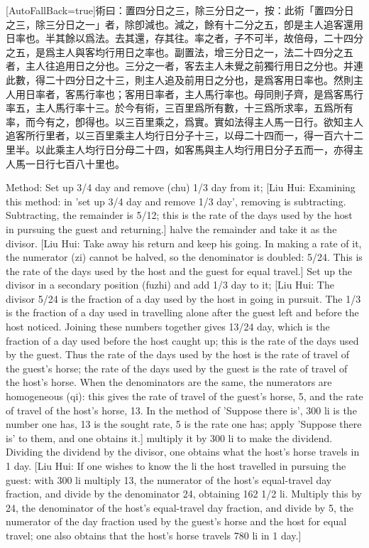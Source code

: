 \documentclass[11pt]{article}
\newcommand{\zhsmall}{\footnotesize\color{black!70}}
\newcommand{\unitlabel}[1]{\marginpar{\raggedleft\tiny\color{gray}#1}}
\newenvironment{unitzh}{\par\CJKfontspec{Noto Serif CJK SC}[AutoFallBack=true]\large\linespread{1.25}\selectfont}{\par}
\newenvironment{uniten}{\par\small\color{black!85}}{\par\medskip}
\begin{document}
\begin{unitzh}\unitlabel{jiuzhang-026.12}術曰：置四分日之三，除三分日之一，{\zhsmall 按：此術「置四分日之三，除三分日之一」者，除卽減也。減之，餘有十二分之五，卽是主人追客還用日率也。}半其餘以爲法。{\zhsmall 去其還，存其往。率之者，子不可半，故倍母，二十四分之五，是爲主人與客均行用日之率也。}副置法，增三分日之一，{\zhsmall 法二十四分之五者，主人往追用日之分也。三分之一者，客去主人未覺之前獨行用日之分也。并連此數，得二十四分日之十三，則主人追及前用日之分也，是爲客用日率也。然則主人用日率者，客馬行率也；客用日率者，主人馬行率也。母同則子齊，是爲客馬行率五，主人馬行率十三。於今有術，三百里爲所有數，十三爲所求率，五爲所有率，而今有之，卽得也。}以三百里乘之，爲實。實如法得主人馬一日行。{\zhsmall 欲知主人追客所行里者，以三百里乘主人均行日分子十三，以母二十四而一，得一百六十二里半。以此乘主人均行日分母二十四，如客馬與主人均行用日分子五而一，亦得主人馬一日行七百八十里也。}\end{unitzh}
\begin{uniten}Method: Set up 3/4 day and remove (chu) 1/3 day from it; [Liu Hui: Examining this method: in 'set up 3/4 day and remove 1/3 day', removing is subtracting. Subtracting, the remainder is 5/12; this is the rate of the days used by the host in pursuing the guest and returning.] halve the remainder and take it as the divisor. [Liu Hui: Take away his return and keep his going. In making a rate of it, the numerator (zi) cannot be halved, so the denominator is doubled: 5/24. This is the rate of the days used by the host and the guest for equal travel.] Set up the divisor in a secondary position (fuzhi) and add 1/3 day to it; [Liu Hui: The divisor 5/24 is the fraction of a day used by the host in going in pursuit. The 1/3 is the fraction of a day used in travelling alone after the guest left and before the host noticed. Joining these numbers together gives 13/24 day, which is the fraction of a day used before the host caught up; this is the rate of the days used by the guest. Thus the rate of the days used by the host is the rate of travel of the guest's horse; the rate of the days used by the guest is the rate of travel of the host's horse. When the denominators are the same, the numerators are homogeneous (qi): this gives the rate of travel of the guest's horse, 5, and the rate of travel of the host's horse, 13. In the method of 'Suppose there is', 300 li is the number one has, 13 is the sought rate, 5 is the rate one has; apply 'Suppose there is' to them, and one obtains it.] multiply it by 300 li to make the dividend. Dividing the dividend by the divisor, one obtains what the host's horse travels in 1 day. [Liu Hui: If one wishes to know the li the host travelled in pursuing the guest: with 300 li multiply 13, the numerator of the host's equal-travel day fraction, and divide by the denominator 24, obtaining 162 1/2 li. Multiply this by 24, the denominator of the host's equal-travel day fraction, and divide by 5, the numerator of the day fraction used by the guest's horse and the host for equal travel; one also obtains that the host's horse travels 780 li in 1 day.]\end{uniten}
\end{document}

